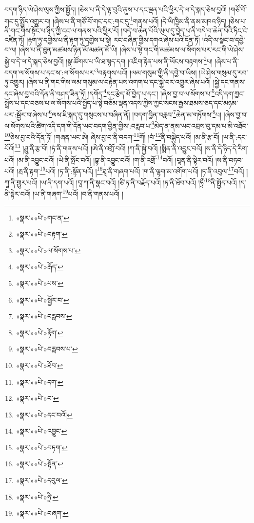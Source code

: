 བདག་ཉིད་ཡེ་ཤེས་ལུས་ཀྱིས་སྤྱོད། །ཅེས་པ་ནི་དེ་ལྟ་བུའི་ནུས་པ་དང་ལྡན་པའི་ཕྱིར་དེ་ལ་དེ་སྐད་ཅེས་བྱའོ། །གཙོ་བོ་གང་དུ་སྤྱོད་འགྱུར་བ། །ཞེས་པ་ནི་གཙོ་བོ་གང་དང་:གང་དུ་\footnote{«སྣར་»«པེ་»གང་ན་}གནས་པའོ། །དེ་ཡི་ཁྱིམ་ནི་ནམ་མཁའ་ཉིད། །ཅེས་པ་ནི་གང་གིས་སྟོང་པ་ཉིད་ཀྱི་ངང་ལ་གནས་པའི་ཕྱིར་རོ། །བདེ་བ་ཆེན་པོའི་ཡུལ་དུ་བྱེད་པ་ནི་བདེ་བ་ཆེན་པོའི་ཏིང་ངེ་འཛིན་ཏོ། །རྟག་ཏུ་དགྱེས་པ་ནི་རྟག་ཏུ་དགྱེས་པ་སྟེ། རང་བཞིན་གྱིས་དགའ་ཞེས་པའི་དོན་ཏོ། །འདི་ལ་སྣང་བ་དབྱེ་བ་ལ། །ཞེས་པ་ནི་ཐུན་མཚམས་ཉིན་མོ་མཚན་མོ་ཡི། །ཞེས་པ་སྟེ་གང་གི་མཚམས་ལ་སོགས་པར་རང་གི་ཡེ་ཤེས་སྐྱེ་བ་དེ་ལ་དེ་སྐད་ཅེས་བྱའོ། །སྣ་ཚོགས་པ་ཡི་ཐ་སྙད་དག །འཇིག་རྟེན་པས་ནི་ཡོངས་བརྟགས་\footnote{«སྣར་»«པེ་»བརྟག་}པ། །ཞེས་པ་ནི་བདག་ལ་སོགས་པ་དང་ས་:ལ་སོགས་པར་\footnote{«སྣར་»«པེ་»ལ་སོགས་པ་}བརྟགས་པའོ། །ལམ་གསུམ་གྱི་ནི་དབྱེ་བ་ཡིས། །ཡེ་ཤེས་གསུམ་དུ་རབ་ཏུ་འགྱུར། །ཞེས་པ་ནི་གང་གིས་ལམ་གསུམ་ལ་བརྟེན་པས་འགག་པ་དང་སྐྱེ་བར་འགྱུར་ཞེས་པའོ། །སྐྱེ་དང་གནས་དང་ཞེས་བྱ་བའི་དོན་ནི་བཤད་ཟིན་ཏོ། །དགོད་\footnote{«སྣར་»«པེ་»རྒོད་}དང་རྩེད་མོ་བྱེད་པ་དང་། །ཞེས་བྱ་བ་ལ་སོགས་པ་\footnote{«སྣར་»«པེ་»པས་}འདི་དག་ཀྱང་སྤྲོས་པ་དང་བཅས་པ་ལ་སོགས་པའི་སྤྱོད་པ་སྟེ་བཅོམ་ལྡན་འདས་ཀྱིས་ཀྱང་སངས་རྒྱས་ཐམས་ཅད་དང་མཉམ་པར་:སྦྱོར་བ་ཞེས་པ་\footnote{«སྣར་»«པེ་»སྦྱོར་བ་}ལས་ཇི་སྐད་དུ་གསུངས་པ་བཞིན་ནོ། །བདག་བྱིན་བརླབ་\footnote{«སྣར་»«པེ་»བརླབས་}ཆེན་མ་གཏོགས་\footnote{«སྣར་»«པེ་»རྟོག་}པ། །ཞེས་བྱ་བ་ལ་སོགས་པའི་ཚིག་འདི་དག་གི་དོན་ཡང་བདག་བྱིན་གྱིས་:བརླབ་པ་\footnote{«སྣར་»«པེ་»བརླབས་པ་}མེད་ན་ནམ་ཡང་འབྲས་བུ་དམ་པ་མི་འཐོབ་\footnote{«སྣར་»«པེ་»ཐོབ་}ཅེས་བྱ་བའི་དོན་ཏོ། །གཞན་ཡང་ཨེ། ཞེས་བྱ་བ་ནི་བདག་\footnote{«སྣར་»«པེ་»དག་}གོ། །བཾ་\footnote{«སྣར་»«པེ་»བ་}ནི་བསྐྱེད་པའོ། །མ་ནི་རྩ་བོ། །ཡ་ནི་:དང་པོའོ།\footnote{«སྣར་»«པེ་»དང་བའོ།} །ཤྲུ་ནི་རྩ་བོ། །ཏཾ་ནི་གནས་པའོ། །ཨེ་ནི་འགྲོ་བའོ། །ཀ་ནི་སྐྱེ་བའོ། །སྨིན་ནི་འབྱུང་བའོ། །ས་ནི་དེ་ཉིད་དེ་རིག་པའོ། །མ་ནི་འབྱུང་བའོ། །ཡེ་ནི་སྤོང་བའོ། །བྷ་ནི་འབྱུང་བའོ། །ག་ནི་འགྲོ་\footnote{«སྣར་»«པེ་»འབྱུང་}བའོ། །བཱན་ནི་སྟེར་བའོ། །ས་ནི་བཏབ་པའོ། །རྦ་ནི་རྟག་\footnote{«སྣར་»«པེ་»བཏག་}པའོ། །ཏ་ནི་:སྟོན་པའོ། །\footnote{«སྣར་»«པེ་»སྟོན་}ཐཱ་ནི་གཞག་པའོ། །ག་ནི་ལྷག་མ་འགོག་པའོ། །ཏ་ནི་འབུལ་\footnote{«སྣར་»«པེ་»དབུལ་}བའོ། །ཀཱ་ནི་གྱུར་པའོ། །ཡ་ནི་དག་པའོ། །བཱ་ཀ་ནི་སྣང་བའོ། །ཙི་ཏ་ནི་བརྗོད་པའོ། །ཏ་ནི་ཐོབ་པའོ། །ཧྲྀ་\footnote{«སྣར་»«པེ་»ཧྲི་}ནི་སྤྱོད་པའོ། །ད་ནི་སྟེར་བའོ། །ཡ་ནི་གཞག་\footnote{«སྣར་»«པེ་»བཞག་}པའོ། །བ་ནི་གནས་པའོ། །
